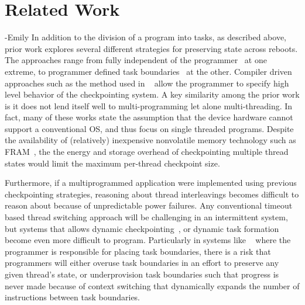 \documentclass[11pt]{sensys-proc}
\begin{document}
\section{Related Work} -Emily
In addition to the division of a program into tasks, as described above, prior work
explores several different strategies for preserving state across reboots. The approaches
range from fully independent of the programmer~\cite{ratchet, dewdrop} at one extreme, to programmer
defined task boundaries~\cite{dino} at the other.  Compiler driven approaches such as the
method used in ~\cite{Mementos} allow the programmer to specify high level behavior of the
checkpointing system. A key similarity among the prior work is it
does not lend itself well to multi-programming let
alone multi-threading. In fact, many of these works state the assumption that the device
hardware cannot support a conventional OS, and thus focus on single threaded programs. 
Despite the availability of (relatively) inexpensive nonvolatile memory technology such as
FRAM~\cite{quickrecall}, the the energy and storage overhead of checkpointing multiple
thread states would limit the maximum per-thread checkpoint size. 

Furthermore, if a multiprogrammed application were implemented using previous
checkpointing strategies, reasoning about thread interleavings becomes  difficult to
reason about because of unpredictable power failures. Any conventional timeout based
thread switching approach will be challenging in an intermittent system, but systems that
allows dynamic checkpointing~\cite{hibernus}, or dynamic task formation~\cite{Dino} become
even more difficult to program. Particularly in systems like ~\cite{Dino} where the
programmer is responsible for placing task boundaries, there is a risk that programmers
will either overuse task boundaries in an effort to preserve any given thread's state, or
underprovision task boundaries such that progress is never made because of context
switching that dynamically expands the number of instructions between task boundaries. 
\end{document}
